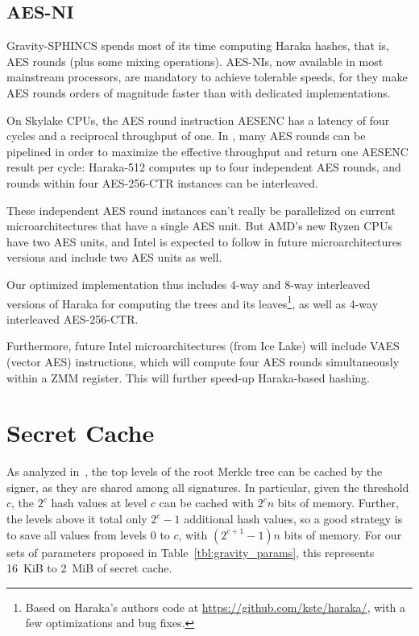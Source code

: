 \subsection{AES-NI}

Gravity-SPHINCS spends most of its time computing Haraka hashes, that is, AES rounds (plus some mixing operations).
AES-NIs, now available in most mainstream processors, are mandatory to achieve tolerable speeds, for they make AES rounds orders of magnitude faster than with dedicated implementations.

On Skylake CPUs, the AES round instruction AESENC has a latency of four cycles and a reciprocal throughput of one.
In \gravity, many AES rounds can be pipelined in order to maximize the effective throughput and return one AESENC result per cycle: Haraka-512 computes up to four independent AES rounds, and rounds within four AES-256-CTR instances can be interleaved.

These independent AES round instances can't really be parallelized on current microarchitectures that have a single AES unit.
But AMD's new Ryzen CPUs have two AES units, and Intel is expected to follow in future microarchitectures versions and include two AES units as well.

Our optimized implementation thus includes 4-way and 8-way interleaved versions of Haraka for computing the trees and its leaves\footnote{Based on Haraka's authors code at \url{https://github.com/kste/haraka/}, with a few optimizations and bug fixes.}, as well as 4-way interleaved AES-256-CTR.

Furthermore, future Intel microarchitectures (from Ice Lake) will include VAES (vector AES) instructions, which will compute four AES rounds simultaneously within a ZMM register.
This will further speed-up Haraka-based hashing.


\section{Secret Cache}\label{sec:caching}

As analyzed in~\cite{ctrsapaper}, the top levels of the root Merkle tree can be cached by the signer, as they are shared among all signatures.
In particular, given the threshold $c$, the $2^c$ hash values at level $c$ can be cached with $2^c n$ bits of memory.
Further, the levels above it total only $2^c-1$ additional hash values, so a good strategy is to save all values from levels 0 to $c$, with $(2^{c+1}-1)n$ bits of memory.
For our sets of parameters proposed in Table~\ref{tbl:gravity_params}, this represents 16~KiB to 2~MiB of secret cache.

